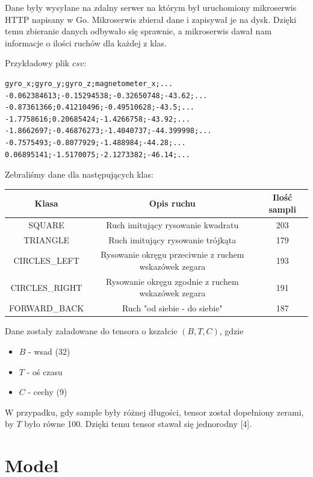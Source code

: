 \documentclass[10pt]{article}
\begin{document}
Dane były wysyłane na zdalny serwer na którym był uruchomiony mikroserwis HTTP napisany w Go. Mikroserwis zbierał dane i zapisywał je na dysk. Dzięki temu zbieranie danych odbywało się sprawnie, a mikroserwis dawał nam informacje o ilości ruchów dla każdej z klas.

Przykładowy plik $csv$:
\begin{verbatim}  
gyro_x;gyro_y;gyro_z;magnetometer_x;...
-0.062384613;-0.15294538;-0.32650748;-43.62;...
-0.87361366;0.41210496;-0.49510628;-43.5;...
-1.7758616;0.20685424;-1.4266758;-43.92;...
-1.8662697;-0.46876273;-1.4040737;-44.399998;...
-0.7575493;-0.8077929;-1.488984;-44.28;...
0.06895141;-1.5170075;-2.1273382;-46.14;...
\end{verbatim}

\pagebreak

Zebraliśmy dane dla następujących klas:

\begin{center}
\begin{tabular}{ |c|c|c| } 
  \hline
  Klasa & Opis ruchu & Ilość sampli \\ 
  \hline
  SQUARE & Ruch imitujący rysowanie kwadratu & 203 \\ 
  \hline
  TRIANGLE & Ruch imitujący rysowanie trójkąta & 179 \\ 
  \hline
  CIRCLES\_LEFT & Rysowanie okręgu przeciwnie z ruchem wskazówek zegara & 193 \\
  \hline
  CIRCLES\_RIGHT & Rysowanie okręgu zgodnie z ruchem wskazówek zegara & 191 \\
  \hline
  FORWARD\_BACK & Ruch "od siebie - do siebie" & 187 \\
  \hline
\end{tabular}
\end{center}

Dane zostały załadowane do tensora o kszałcie $(B, T, C)$, gdzie
\begin{itemize}
\item $B$ - wsad (32)
\item $T$ - oś czasu
\item $C$ - cechy (9)
\end{itemize}  

W przypadku, gdy sample były różnej długości, tensor został dopełniony zerami, by $T$ było równe 100. Dzięki temu tensor stawał się jednorodny [4]. 

\section{Model}
\end{document}

